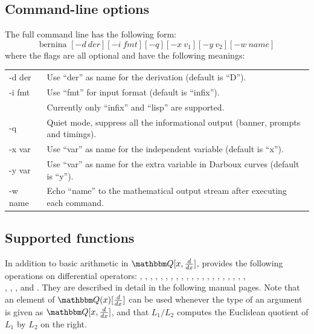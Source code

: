 \subsection{Command-line options}
The full \bernina{} command line has the following form:
$$
\mbox{bernina~} [-d~der] [-i~fmt] [-q] [-x~v_1] [-y~v_2] [-w~name]
$$
where the flags are all optional and have the following meanings:\\
\begin{tabular}{ll}
-d der & Use ``der'' as name for the derivation (default is ``D'').\\
-i fmt & Use ``fmt'' for input format (default is ``infix'').\\
       & Currently only ``infix'' and ``lisp'' are supported.\\
-q     & Quiet mode, suppress all the informational output (banner, prompts and
         timings).\\
-x var & Use ``var'' as name for the independent variable (default is ``x'').\\
-y var & Use ``var'' as name for the extra variable in Darboux curves (default
         is ``y'').\\
-w name& Echo ``name'' to the mathematical output stream after executing each
         command.\\
\end{tabular}

\subsection{Supported functions}
In addition to basic arithmetic in $\weyl$, \bernina{} provides the following
operations on differential operators:
, , ,
, , , ,
, , ,
,
,
,
, , ,
, ,
,
, ,\\ %
, ,
,  %
and .
They are described in detail in the following manual pages.
Note that an element of $\weylq$ can be used
whenever the type of an argument is given as $\weyl$,
and that $L_1 / L_2$ computes the Euclidean quotient of
$L_1$ by $L_2$ on the right.


